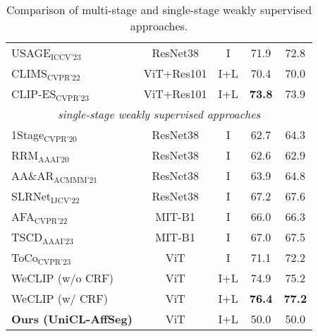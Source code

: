 \begin{table}[ht]
\begin{tabular}{l c c c c}
        USAGE$_{\text{ICCV'23}}$~\cite{wsss_usage}    & ResNet38   & I    & 71.9          & 72.8          \\
        CLIMS$_{\text{CVPR'22}}$~\cite{wsss_clims}    & ViT+Res101 & I+L  & 70.4          & 70.0          \\
        CLIP-ES$_{\text{CVPR'23}}$~\cite{wsss_clip_es}                       & ViT+Res101 & I+L  & \textbf{73.8} & 73.9          \\
        \hline
        \multicolumn{5}{c}{\textit{single-stage weakly supervised approaches}}                                                   \\
        1Stage$_{\text{CVPR'20}}$~\cite{wsss_single_stage}                   & ResNet38   & I    & 62.7          & 64.3          \\
        RRM$_{\text{AAAI'20}}$~\cite{wsss_reliability_does_matter}           & ResNet38   & I    & 62.6          & 62.9          \\
        AA\&AR$_{\text{ACMMM'21}}$~\cite{wsss_aaar}                                 & ResNet38   & I    & 63.9          & 64.8          \\
        SLRNet$_{\text{IJCV'22}}$~\cite{wsss_slr_net}                                  & ResNet38   & I    & 67.2          & 67.6          \\
        AFA$_{\text{CVPR'22}}$~\cite{wsss_afa_affinity_from_attention}                                     & MIT-B1     & I    & 66.0          & 66.3          \\
        TSCD$_{\text{AAAI'23}}$~\cite{wsss_tscd}                                    & MIT-B1     & I    & 67.0          & 67.5          \\
        ToCo$_{\text{CVPR'23}}$~\cite{wsss_toco_token_contrast}                                    & ViT        & I    & 71.1          & 72.2          \\
        WeCLIP (w/o CRF)                                                & ViT        & I+L  & 74.9          & 75.2          \\
        WeCLIP (w/ CRF)                                                 & ViT        & I+L  & \textbf{76.4} & \textbf{77.2} \\
        \hline
        \textbf{Ours (UniCL-AffSeg)} & ViT & I+L & 50.0 & 50.0 \\
        \hline
    \end{tabular}
    \caption{Comparison of multi-stage and single-stage weakly supervised approaches.}
    \label{tab:quantitative_results}
\end{table}
